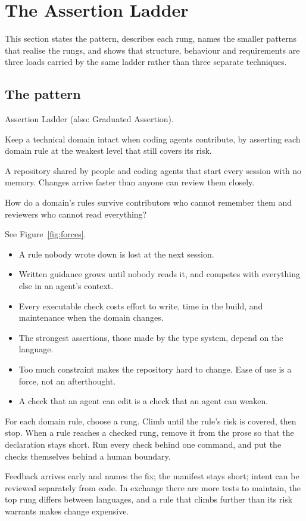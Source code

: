 \section{The Assertion Ladder}\label{sec:ladder}

This section states the pattern, describes each rung, names the smaller patterns that realise
the rungs, and shows that structure, behaviour and requirements are three loads carried by the
same ladder rather than three separate techniques.

\subsection{The pattern}

\begin{description}[leftmargin=2.2cm,style=nextline]
  \item[Name] Assertion Ladder (also: Graduated Assertion).
  \item[Intent] Keep a technical domain intact when coding agents contribute, by asserting each
    domain rule at the weakest level that still covers its risk.
  \item[Context] A repository shared by people and coding agents that start every session with
    no memory. Changes arrive faster than anyone can review them closely.
  \item[Problem] How do a domain's rules survive contributors who cannot remember them and
    reviewers who cannot read everything?
  \item[Forces] See Figure~\ref{fig:forces}.
    \begin{itemize}
      \item A rule nobody wrote down is lost at the next session.
      \item Written guidance grows until nobody reads it, and competes with everything else in
        an agent's context.
      \item Every executable check costs effort to write, time in the build, and maintenance
        when the domain changes.
      \item The strongest assertions, those made by the type system, depend on the language.
      \item Too much constraint makes the repository hard to change. Ease of use is a force, not
        an afterthought.
      \item A check that an agent can edit is a check that an agent can weaken.
    \end{itemize}
  \item[Solution] For each domain rule, choose a rung. Climb until the rule's risk is covered,
    then stop. When a rule reaches a checked rung, remove it from the prose so that the
    declaration stays short. Run every check behind one command, and put the checks themselves
    behind a human boundary.
  \item[Consequences] Feedback arrives early and names the fix; the manifest stays short;
    intent can be reviewed separately from code. In exchange there are more tests to maintain,
    the top rung differs between languages, and a rule that climbs further than its risk
    warrants makes change expensive.
\end{description}

